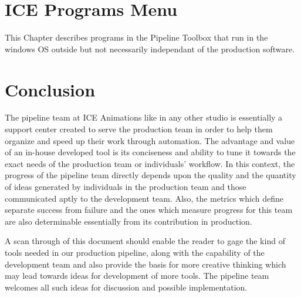 \documentclass[10pt,a4paper,openany,oneside,onecolumn,titlepage]{report}
\begin{document}


\chapter{ICE Programs Menu}

This Chapter describes programs in the Pipeline Toolbox that run in the
windows OS outside but not necessarily independant of the production software.






\chapter{Conclusion}

The pipeline team at ICE Animations like in any other studio is essentially a
support center created to serve the production team in order to help them
organize and speed up their work through automation. The advantage and value
of an in-house developed tool is its conciseness and ability to tune it
towards the exact needs of the production team or individuals’ workflow. In
this context, the progress of the pipeline team directly depends upon the
quality and the quantity of ideas generated by individuals in the production
team and those communicated aptly to the development team. Also, the metrics
which define separate success from failure and the ones which measure progress
for this team are also determinable essentially from its contribution in
production.

A scan through of this document should enable the reader to gage
the kind of tools needed in our production pipeline, along with the capability
of the development team and also provide the basis for more creative thinking
which may lead towards ideas for development of more tools. The pipeline team
welcomes all such ideas for discussion and possible implementation.
\end{document}
